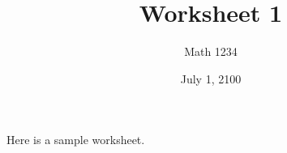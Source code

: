 \documentclass{article}
\title{Worksheet 1}
\date{July 1, 2100}
\author{Math 1234}
\begin{document}
\maketitle

Here is a sample worksheet.




  
\end{document}
